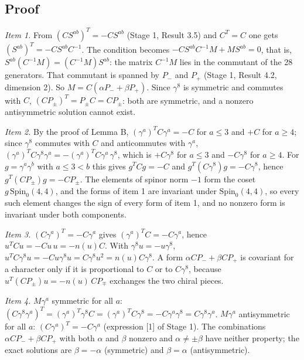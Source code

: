\documentclass[11pt]{article}
\begin{document}
\subsection{Proof}

\emph{Item 1.} From $(CS^{ab})^T=-CS^{ab}$ (Stage 1, Result 3.5) and $C^T=C$ one gets $(S^{ab})^T=-CS^{ab}C^{-1}$. The condition becomes $-CS^{ab}C^{-1}M+MS^{ab}=0$, that is, $S^{ab}(C^{-1}M)=(C^{-1}M)S^{ab}$: the matrix $C^{-1}M$ lies in the commutant of the 28 generators. That commutant is spanned by $P_-$ and $P_+$ (Stage 1, Result 4.2, dimension 2). So $M=C(\alpha P_-+\beta P_+)$. Since $\gamma^8$ is symmetric and commutes with $C$, $(CP_\pm)^T=P_\pm C=CP_\pm$: both are symmetric, and a nonzero antisymmetric solution cannot exist.

\emph{Item 2.} By the proof of Lemma B, $(\gamma^a)^TC\gamma^a=-C$ for $a\le3$ and $+C$ for $a\ge4$; since $\gamma^8$ commutes with $C$ and anticommutes with $\gamma^a$, $(\gamma^a)^TC\gamma^8\gamma^a=-(\gamma^a)^TC\gamma^a\,\gamma^8$, which is $+C\gamma^8$ for $a\le3$ and $-C\gamma^8$ for $a\ge4$. For $g=\gamma^a\gamma^b$ with $a\le3<b$ this gives $g^TCg=-C$ and $g^T(C\gamma^8)g=-C\gamma^8$, hence $g^T(CP_\pm)g=-CP_\pm$. The elements of spinor norm $-1$ form the coset $g\,\mathrm{Spin}_0(4,4)$, and the forms of item 1 are invariant under $\mathrm{Spin}_0(4,4)$, so every such element changes the sign of every form of item 1, and no nonzero form is invariant under both components.

\emph{Item 3.} $(C\gamma^a)^T=-C\gamma^a$ gives $(\gamma^a)^TC=-C\gamma^a$, hence $u^TCu=-Cu\,u=-n(u)C$. With $\gamma^8u=-u\gamma^8$, $u^TC\gamma^8u=-Cu\gamma^8u=C\gamma^8u^2=n(u)C\gamma^8$. A form $\alpha CP_-+\beta CP_+$ is covariant for a character only if it is proportional to $C$ or to $C\gamma^8$, because $u^T(CP_\pm)u=-n(u)\,CP_\mp$ exchanges the two chiral pieces.

\emph{Item 4.} $M\gamma^a$ symmetric for all $a$: $(C\gamma^8\gamma^a)^T=(\gamma^a)^T\gamma^8C=(\gamma^a)^TC\gamma^8=-C\gamma^a\gamma^8=C\gamma^8\gamma^a$. $M\gamma^a$ antisymmetric for all $a$: $(C\gamma^a)^T=-C\gamma^a$ (expression [1] of Stage 1). The combinations $\alpha CP_-+\beta CP_+$ with both $\alpha$ and $\beta$ nonzero and $\alpha\ne\pm\beta$ have neither property; the exact solutions are $\beta=-\alpha$ (symmetric) and $\beta=\alpha$ (antisymmetric).
\end{document}
